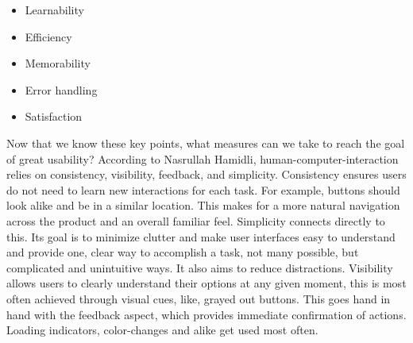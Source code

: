 \begin{itemize}
    \item Learnability

    \item Efficiency

    \item Memorability

    \item Error handling

    \item Satisfaction
\end{itemize}
\autocite{Paul:Usability101}

\blankLine

Now that we know these key points, what measures can we take to reach the goal of great usability? According to Nasrullah Hamidli, human-computer-interaction relies on consistency, visibility, feedback, and simplicity. Consistency ensures users do not need to learn new interactions for each task. For example, buttons should look alike and be in a similar location. This makes for a more natural navigation across the product and an overall familiar feel. Simplicity connects directly to this. Its goal is to minimize clutter and make user interfaces easy to understand and provide one, clear way to accomplish a task, not many possible, but complicated and unintuitive ways. It also aims to reduce distractions. Visibility allows users to clearly understand their options at any given moment, this is most often achieved through visual cues, like, grayed out buttons. This goes hand in hand with the feedback aspect, which provides immediate confirmation of actions. Loading indicators, color-changes and alike get used most often.

